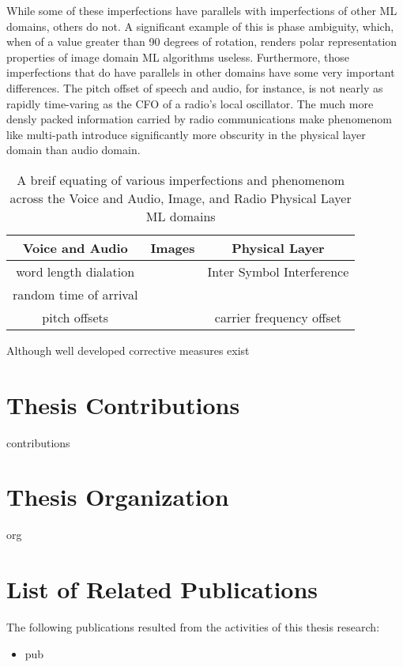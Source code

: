While some of these imperfections have parallels with imperfections of other ML domains, others do not. A significant example of this is phase ambiguity, which, when of a value greater than 90 degrees of rotation, renders polar representation properties of image domain ML algorithms useless. Furthermore, those imperfections that do have parallels in other domains have some very important differences. The pitch offset of speech and audio, for instance, is not nearly as rapidly time-varing as the CFO of a radio's local oscillator. The much more densly packed information carried by radio communications make phenomenom like multi-path introduce significantly more obscurity in the physical layer domain than audio domain.

\begin{table*}[t!]
\centering
\caption{A breif equating of various imperfections and phenomenom across the Voice and Audio, Image, and Radio Physical Layer ML domains}
\begin{tabular}{c  c  c }
\toprule
Voice and Audio & Images & Physical Layer\\\hline\hline
word length dialation & & Inter Symbol Interference\\
random time of arrival & &\\
pitch offsets & & carrier frequency offset\\
\hline
\bottomrule
\end{tabular}
\label{table:mldomains}
\end{table*}

Although well developed corrective measures exist 

\section{Thesis Contributions}
contributions

\section{Thesis Organization}
org

\section{List of Related Publications}
The following publications resulted from the activities of this thesis research:
\begin{itemize}
	\item pub
\end{itemize}